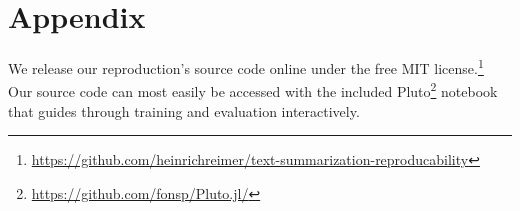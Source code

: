 \appendix
\section{Appendix} %

We release our reproduction's source code online under the free MIT license.\footnote{\url{https://github.com/heinrichreimer/text-summarization-reproducability}}
Our source code can most easily be accessed with the included Pluto\footnote{\url{https://github.com/fonsp/Pluto.jl/}} notebook that guides through training and evaluation interactively.

